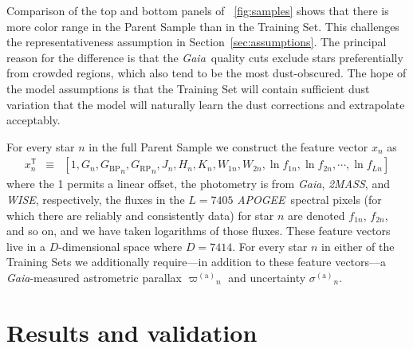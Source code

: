 \documentclass[modern]{aastex62}
\newcommand{\sectionname}{Section}
\newcommand{\acronym}[1]{{\small{#1}}}
\newcommand{\project}[1]{\textsl{#1}}
\newcommand{\apogee}{\project{\acronym{APOGEE}}}
\newcommand{\gaia}{\project{Gaia}}
\newcommand{\wise}{\project{\acronym{WISE}}}
\newcommand{\zmass}{\project{\acronym{2MASS}}}
\newcommand{\T}{^{\mathsf{T}}}
\newcommand{\BP}{{G_\mathrm{BP}}}
\newcommand{\RP}{{G_\mathrm{RP}}}
\newcommand{\gparallax}{{\varpi^{(\mathrm{a})}}}
\newcommand{\gsigma}{{\sigma^{(\mathrm{a})}}}
\begin{document}
Comparison of the top and bottom panels of {\figurename}~\ref{fig:samples} shows
that there is more color range in the Parent Sample than in the Training Set.
This challenges the representativeness assumption in \sectionname~\ref{sec:assumptions}.
The principal reason for the difference is that the \gaia\ quality cuts
exclude stars preferentially from crowded regions, which also tend to be the
most dust-obscured.
The hope of the model assumptions is that the Training Set will contain sufficient
dust variation that the model will naturally learn the dust corrections and extrapolate
acceptably.

For every star $n$ in the full Parent Sample we construct the feature
vector $x_n$ as
\begin{eqnarray}
x_n\T &\equiv& [1, G_n, \BP_n, \RP_n, J_n, H_n, K_n, W_{1n}, W_{2n}, \ln f_{1n}, \ln f_{2n}, \cdots, \ln f_{Ln}]
\end{eqnarray}
where the 1 permits a linear offset,
the photometry is from \gaia, \zmass, and \wise, respectively,
the fluxes in the $L=7405$ \apogee\ spectral pixels (for which there are reliably
and consistently data) for star $n$ are denoted
$f_{1n}$, $f_{2n}$, and so on,
and we have taken logarithms of those fluxes.
These feature vectors live in a $D$-dimensional space where $D=7414$.
For every star $n$ in either of the Training Sets we additionally require---in
addition to these feature vectors---a \gaia-measured astrometric parallax $\gparallax_n$
and uncertainty $\gsigma_n$.

\section{Results and validation}
\end{document}
